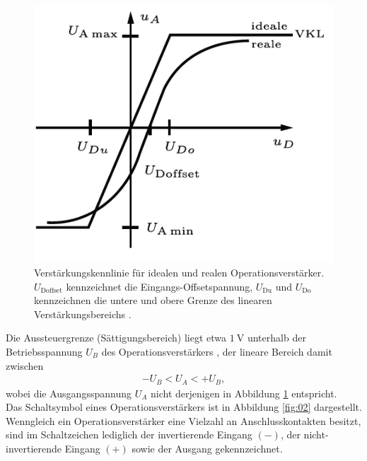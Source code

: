 \begin{figure}
  \centering
  \includegraphics[scale=0.8]{ressources/figure_01.png}
  \caption{Verstärkungskennlinie für idealen und realen Operationsverstärker. $U_\text{Doffset}$
  kennzeichnet die Eingangs-Offsetspannung, $U_\text{Du}$ und $U_\text{Do}$ kennzeichnen
  die untere und obere Grenze des linearen Verstärkungsbereichs \cite{elektrotechnik}.}
  \label{fig:01}
\end{figure}
\FloatBarrier
\noindent Die Aussteuergrenze (Sättigungsbereich) liegt etwa $\SI{1}{\volt}$
unterhalb der Betriebsspannung $U_B$ des Operationsverstärkers \cite{federau}, der
lineare Bereich damit zwischen
\begin{align}
  - U_B < U_A < + U_B,
  \label{eqn:02}
\end{align}
\noindent wobei die Ausgangsspannung $U_A$ nicht derjenigen in Abbildung \ref{fig:01}
entspricht. \\
\newline
\noindent Das Schaltsymbol eines Operationsverstärkers ist in Abbildung \ref{fig:02}
dargestellt. Wenngleich ein Operationsverstärker eine Vielzahl an
Anschlusskontakten besitzt, sind im Schaltzeichen lediglich der
invertierende Eingang $(-)$, der nicht-invertierende Eingang $(+)$ sowie der
Ausgang gekennzeichnet.
